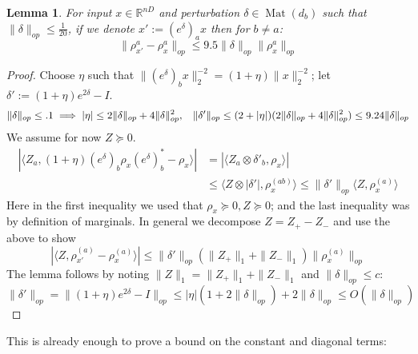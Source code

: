 \documentclass[aos]{imsart}
\newtheorem{lemma}[theorem]{Lemma}
\theoremstyle{definition}
\numberwithin{equation}{section}
\DeclareMathOperator{\Mat}{Mat}
\newcommand{\R}{{\mathbb{R}}}
\newcommand{\samp}{x}
\newcommand{\CF}[1]{{\color{purple}[CF: #1]}}
\newcommand{\AR}[1]{{\color{orange}[AR: #1]}}
\begin{document}
\begin{appendix}
\begin{lemma} \label{btoaaRobustness}
For input $\samp \in \R^{nD}$ and perturbation $\delta \in \Mat(d_{b})$ such that $\|\delta\|_{op} \leq \frac{1}{20}$, if we denote $\samp' := (e^{\delta})_{a} \samp$ then for $b \neq a$:
\[ \|\rho_{\samp'}^{a} - \rho_{\samp}^{a}\|_{op} \leq 9.5 \|\delta\|_{op} \|\rho_{\samp}^{a}\|_{op}      \]
\end{lemma}
\begin{proof}
Choose $\eta$ such that $\|(e^{\delta})_{b} \samp\|_{2}^{-2} = (1+\eta) \|\samp\|_{2}^{-2}$; let $\delta' := (1+\eta)e^{2\delta} - I$.
\[ \|\delta\|_{op} \leq .1 \implies |\eta| \leq 2\|\delta\|_{op} + 4\|\delta\|_{op}^{2}, \hspace{3mm} \|\delta'\|_{op} \leq (2+|\eta|)(2\|\delta\|_{op} + 4\|\delta\|_{op}^{2}) \leq 9.24 \|\delta\|_{op} \]
We assume for now $Z \succeq 0$.
\begin{align*} | \langle Z_{a}, (1+\eta) (e^{\delta})_{b} \rho_{\samp} (e^{\delta})_{b}^{*} - \rho_{\samp} \rangle|
& = | \langle Z_{a} \otimes \delta'_{b}, \rho_{\samp} \rangle   |  \\
&\leq \langle Z \otimes |\delta'|, \rho_{\samp}^{(ab)} \rangle
\leq \|\delta'\|_{op} \langle Z, \rho_{\samp}^{(a)} \rangle
\end{align*}
Here in the first inequality we used that $\rho_{\samp} \succeq 0, Z \succeq 0$; and the last inequality was by definition of marginals.
In general we decompose $Z = Z_{+} - Z_{-}$ and use the above to show
\[ |\langle Z, \rho_{\samp'}^{(a)} - \rho_{\samp}^{(a)} \rangle| \leq \|\delta'\|_{op} (\|Z_{+}\|_{1} + \|Z_{-}\|_{1}) \|\rho_{\samp}^{(a)}\|_{op}     \]
The lemma follows by noting $\|Z\|_{1} = \|Z_{+}\|_{1} + \|Z_{-}\|_{1}$ and $\|\delta\|_{op} \leq c$:
\[ \|\delta'\|_{op} = \|(1+\eta) e^{2 \delta} - I\|_{op} \leq |\eta|(1 + 2 \|\delta\|_{op}) + 2\|\delta\|_{op} \leq O(\|\delta\|_{op})  \]
\end{proof}

This is already enough to prove a bound on the constant and diagonal terms:


\end{appendix}
\end{document}

